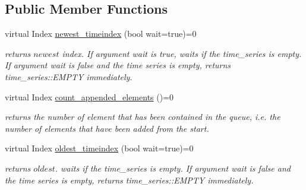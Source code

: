 \subsection*{Public Member Functions}
\begin{DoxyCompactItemize}
\item 
\mbox{\label{classtime__series_1_1TimeSeriesInterface_a19127d715b58f95c0e2581576fe80f18}} 
virtual Index \hyperlink{classtime__series_1_1TimeSeriesInterface_a19127d715b58f95c0e2581576fe80f18}{newest\+\_\+timeindex} (bool wait=true)=0
\begin{DoxyCompactList}\small\item\em returns $ newest $ index. If argument wait is true, waits if the time\+\_\+series is empty. If argument wait is false and the time series is empty, returns time\+\_\+series\+::\+E\+M\+P\+TY immediately. \end{DoxyCompactList}\item 
\mbox{\label{classtime__series_1_1TimeSeriesInterface_a46cf7fc73adfcc400fbf40c22aa7268f}} 
virtual Index \hyperlink{classtime__series_1_1TimeSeriesInterface_a46cf7fc73adfcc400fbf40c22aa7268f}{count\+\_\+appended\+\_\+elements} ()=0
\begin{DoxyCompactList}\small\item\em returns the number of element that has been contained in the queue, i.\+e. the number of elements that have been added from the start. \end{DoxyCompactList}\item 
\mbox{\label{classtime__series_1_1TimeSeriesInterface_a3a68de9ecf8bfeb6c05ea89386537307}} 
virtual Index \hyperlink{classtime__series_1_1TimeSeriesInterface_a3a68de9ecf8bfeb6c05ea89386537307}{oldest\+\_\+timeindex} (bool wait=true)=0
\begin{DoxyCompactList}\small\item\em returns $ oldest $. waits if the time\+\_\+series is empty. If argument wait is false and the time series is empty, returns time\+\_\+series\+::\+E\+M\+P\+TY immediately. \end{DoxyCompactList}\item 
\mbox{\label{classtime__series_1_1TimeSeriesInterface_ad3b66b6b5f0f763d440731c50e41b4cb}} 

\end{DoxyCompactItemize}
